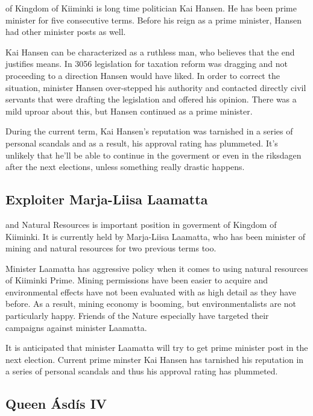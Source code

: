 \documentclass{tufte-book}
\begin{document}
 of Kingdom of Kiiminki is long time
politician Kai Hansen. He has been prime minister for five consecutive terms.
Before his reign as a prime minister, Hansen had other minister posts as well.

Kai Hansen can be characterized as a ruthless man, who believes that the end
justifies means. In 3056 legislation for taxation reform was dragging and not
proceeding to a direction Hansen would have liked. In order to correct the
situation, minister Hansen over-stepped his authority and contacted directly
civil servants that were drafting the legislation and offered his opinion.
There was a mild uproar about this, but Hansen continued as a prime minister.

During the current term, Kai Hansen's reputation was tarnished in a series of
personal scandals and as a result, his approval rating has plummeted. It's
unlikely that he'll be able to continue in the goverment or even in the
riksdagen after the next elections, unless something really drastic happens.

\subsection{Exploiter Marja-Liisa Laamatta}
\label{sc:bio-marja-liisa-laamatta}

 and Natural Resources is important position in
goverment of Kingdom of Kiiminki. It is currently held by Marja-Liisa Laamatta,
who has been minister of mining and natural resources for two previous terms
too.

Minister Laamatta has aggressive policy when it comes to using natural
resources of Kiiminki Prime. Mining permissions have been easier to acquire
and environmental effects have not been evaluated with as high detail as they
have before. As a result, mining economy is booming, but environmentalists are
not particularly happy. Friends of the Nature especially have targeted their
campaigns against minister Laamatta.

It is anticipated that minister Laamatta will try to get prime minister post
in the next election. Current prime minster Kai Hansen has tarnished his
reputation in a series of personal scandals and thus his approval rating has
plummeted.

\subsection{Queen \'{A}sd\'{i}s IV}
\label{sc:bio-asdis}
\end{document}

